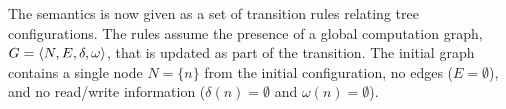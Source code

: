 The semantics is now given as a set of transition rules relating tree configurations. The rules assume the presence of a global computation graph, $G = \langle N, E, \delta, \omega \rangle $, that is updated as part of the transition. The initial graph contains a single node $N = \{n\}$ from the initial configuration, no edges ($E = \emptyset$), and no read/write information ($\delta(n) = \emptyset$ and $\omega(n) = \emptyset$).

